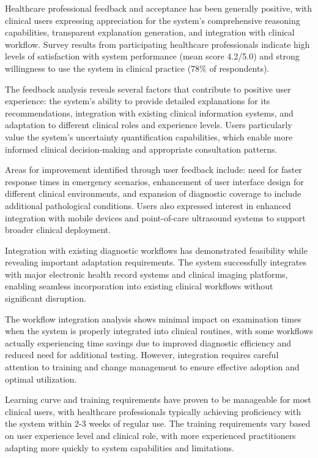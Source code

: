Healthcare professional feedback and acceptance has been generally positive, with clinical users expressing appreciation for the system's comprehensive reasoning capabilities, transparent explanation generation, and integration with clinical workflow. Survey results from participating healthcare professionals indicate high levels of satisfaction with system performance (mean score 4.2/5.0) and strong willingness to use the system in clinical practice (78\% of respondents).

The feedback analysis reveals several factors that contribute to positive user experience: the system's ability to provide detailed explanations for its recommendations, integration with existing clinical information systems, and adaptation to different clinical roles and experience levels. Users particularly value the system's uncertainty quantification capabilities, which enable more informed clinical decision-making and appropriate consultation patterns.

Areas for improvement identified through user feedback include: need for faster response times in emergency scenarios, enhancement of user interface design for different clinical environments, and expansion of diagnostic coverage to include additional pathological conditions. Users also expressed interest in enhanced integration with mobile devices and point-of-care ultrasound systems to support broader clinical deployment.

Integration with existing diagnostic workflows has demonstrated feasibility while revealing important adaptation requirements. The system successfully integrates with major electronic health record systems and clinical imaging platforms, enabling seamless incorporation into existing clinical workflows without significant disruption.

The workflow integration analysis shows minimal impact on examination times when the system is properly integrated into clinical routines, with some workflows actually experiencing time savings due to improved diagnostic efficiency and reduced need for additional testing. However, integration requires careful attention to training and change management to ensure effective adoption and optimal utilization.

Learning curve and training requirements have proven to be manageable for most clinical users, with healthcare professionals typically achieving proficiency with the system within 2-3 weeks of regular use. The training requirements vary based on user experience level and clinical role, with more experienced practitioners adapting more quickly to system capabilities and limitations.

